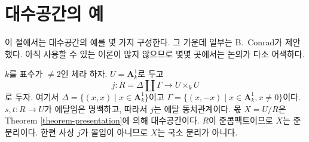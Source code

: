 \section{대수공간의 예}
\label{section-examples}

\noindent
이 절에서는 대수공간의 예를 몇 가지 구성한다. 그 가운데 일부는
B.\ Conrad가 제안했다. 아직 사용할 수 있는 이론이 많지 않으므로
몇몇 곳에서는 논의가 다소 어색하다.

\begin{example}
\label{example-affine-line-involution}
$k$를 표수가 $\not = 2$인 체라 하자. $U = \mathbf{A}^1_k$로 두고
$$
j : R = \Delta \amalg \Gamma \longrightarrow U \times_k U
$$
로 두자. 여기서
$\Delta = \{(x, x) \mid x \in \mathbf{A}^1_k\}$이고
$\Gamma = \{(x, -x) \mid x \in \mathbf{A}^1_k, x \not = 0\}$이다.
$s, t : R \to U$가 에탈임은 명백하고, 따라서 $j$는 에탈
동치관계이다. 몫 $X = U/R$은 Theorem \ref{theorem-presentation}에
의해 대수공간이다. $R$이 준콤팩트이므로 $X$는 준분리이다.
한편 사상 $j$가 몰입이 아니므로 $X$는 국소 분리가 아니다.
\end{example}

